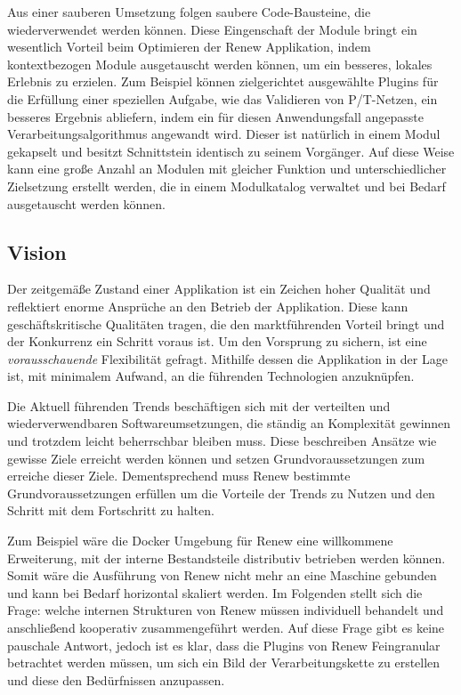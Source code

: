 Aus einer sauberen Umsetzung folgen saubere Code-Bausteine, die wiederverwendet werden können. Diese Eingenschaft der Module bringt ein wesentlich Vorteil beim Optimieren der Renew Applikation, indem kontextbezogen Module ausgetauscht werden können, um ein besseres, lokales Erlebnis zu erzielen. Zum Beispiel können zielgerichtet ausgewählte Plugins für die Erfüllung einer speziellen Aufgabe, wie das Validieren von P/T-Netzen, ein besseres Ergebnis abliefern, indem ein für diesen Anwendungsfall angepasste Verarbeitungsalgorithmus angewandt wird. Dieser ist natürlich in einem Modul gekapselt und besitzt Schnittstein identisch zu seinem Vorgänger. Auf diese Weise kann eine große Anzahl an Modulen mit gleicher Funktion und unterschiedlicher Zielsetzung erstellt werden, die in einem Modulkatalog verwaltet und bei Bedarf ausgetauscht werden können.

\subsection{Vision} \label{sub:moderner_zustand}
Der zeitgemäße Zustand einer Applikation ist ein Zeichen hoher Qualität und reflektiert enorme Ansprüche an den Betrieb der Applikation. Diese kann geschäftskritische Qualitäten tragen, die den marktführenden Vorteil bringt und der Konkurrenz ein Schritt voraus ist. Um den Vorsprung zu sichern, ist eine \textit{vorausschauende} Flexibilität gefragt. Mithilfe dessen die Applikation in der Lage ist, mit minimalem Aufwand, an die führenden Technologien anzuknüpfen. 

Die Aktuell führenden Trends beschäftigen sich mit der verteilten und wiederverwendbaren Softwareumsetzungen, die ständig an Komplexität gewinnen und trotzdem leicht beherrschbar bleiben muss. Diese beschreiben Ansätze wie gewisse Ziele erreicht werden können und setzen Grundvoraussetzungen zum erreiche dieser Ziele. Dementsprechend muss Renew bestimmte Grundvoraussetzungen erfüllen um die Vorteile der Trends zu Nutzen und den Schritt mit dem Fortschritt zu halten.  \bigbreak


Zum Beispiel wäre die Docker Umgebung für Renew eine willkommene Erweiterung, mit der interne Bestandsteile distributiv betrieben werden können. Somit wäre die Ausführung von Renew nicht mehr an eine Maschine gebunden und kann bei Bedarf horizontal skaliert werden. Im Folgenden stellt sich die Frage: welche internen Strukturen von Renew müssen individuell behandelt und anschließend kooperativ zusammengeführt werden. Auf diese Frage gibt es keine pauschale Antwort, jedoch ist es klar, dass die Plugins von Renew Feingranular betrachtet werden müssen, um sich ein Bild der Verarbeitungskette zu erstellen und diese den Bedürfnissen anzupassen. \bigbreak

